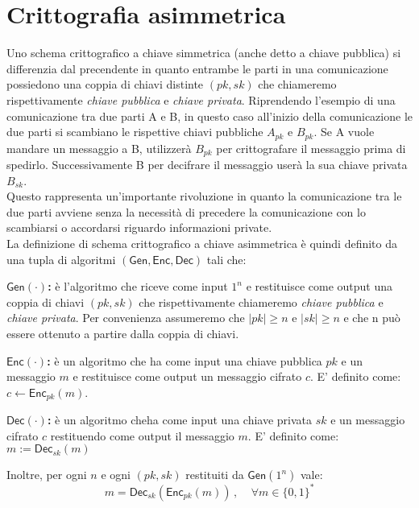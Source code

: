 \section{Crittografia asimmetrica}
Uno schema crittografico a chiave simmetrica (anche detto a chiave pubblica) si differenzia dal precendente in quanto entrambe le parti in una comunicazione possiedono una coppia di chiavi distinte $(pk, sk)$ che chiameremo rispettivamente \emph{chiave pubblica} e \emph{chiave privata}. Riprendendo l'esempio di una comunicazione tra due parti A e B, in questo caso all'inizio della comunicazione le due parti si scambiano le rispettive chiavi pubbliche $A_{pk}$ e $B_{pk}$. Se A vuole mandare un messaggio a B, utilizzerà $B_{pk}$ per crittografare il messaggio prima di spedirlo. Successivamente B per decifrare il messaggio userà la sua chiave privata $B_{sk}$.\\
Questo rappresenta un'importante rivoluzione in quanto la comunicazione tra le due parti avviene senza la necessità di precedere la comunicazione con lo scambiarsi o accordarsi riguardo informazioni private. \\
La definizione di schema crittografico a chiave asimmetrica è quindi definito da una tupla di algoritmi $(\mathsf{Gen}, \mathsf{Enc}, \mathsf{Dec})$ tali che:
\begin{itemize}
    \item{\textbf{$\mathsf{Gen}(\cdot)$:} è l'algoritmo che riceve come input $1^n$ e restituisce come output una coppia di chiavi $(pk, sk)$ che rispettivamente chiameremo \emph{chiave pubblica} e \emph{chiave privata}. Per convenienza assumeremo che $|pk| \geq n$ e $|sk| \geq n$ e che n può essere ottenuto a partire dalla coppia di chiavi.
    \item{\textbf{$\mathsf{Enc}(\cdot)$:} è un algoritmo che ha come input una chiave pubblica $pk$ e un messaggio $m$ e restituisce come output un messaggio cifrato $c$. E' definito come: $c \leftarrow \mathsf{Enc}_{pk}(m)$}.
    \item{\textbf{$\mathsf{Dec}(\cdot)$:} è un algoritmo cheha come input una chiave privata $sk$ e un messaggio cifrato $c$ restituendo come output il messaggio $m$. E' definito come: $m := \mathsf{Dec}_{sk}(m)$}}
\end{itemize}
Inoltre, per ogni $n$ e ogni $(pk, sk)$ restituiti da $\mathsf{Gen}(1^{n})$ vale:
$$
    m = \mathsf{Dec}_{sk}(\mathsf{Enc}_{pk}(m))\,,\;\;\;\;\forall m \in \{0, 1\}^{*}
$$
